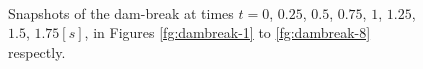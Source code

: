 \begin{figure}[H]
{    }
     \\
   \caption{Snapshots of the dam-break at times $t=0$, $0.25$, $0.5$, $0.75$, $1$, $1.25$, $1.5$, $1.75[s]$, in Figures \ref{fg:dambreak-1} to \ref{fg:dambreak-8} respectly.}
   \label{fg:dambreak-screenshots}
\end{figure}
\clearpage
